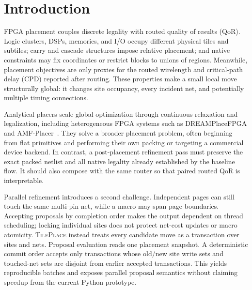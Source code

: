 \documentclass[sigconf,anonymous,review]{acmart}
\newcommand{\system}{\textsc{TilePlace}}
\begin{document}
\maketitle

\section{Introduction}

FPGA placement couples discrete legality with routed quality of results (QoR).
Logic clusters, DSPs, memories, and I/O occupy different physical tiles and
subtiles; carry and cascade structures impose relative placement; and native
constraints may fix coordinates or restrict blocks to unions of regions.
Meanwhile, placement objectives are only proxies for the routed wirelength and
critical-path delay (CPD) reported after routing.  These properties make a
small local move structurally global: it changes site occupancy, every
incident net, and potentially multiple timing connections.

Analytical placers scale global optimization through continuous relaxation
and legalization, including heterogeneous FPGA systems such as
DREAMPlaceFPGA and AMF-Placer~\cite{rajarathnam2022dreamplacefpga,liang2024amf}.
They solve a broader placement problem, often beginning from flat primitives
and performing their own packing or targeting a commercial device backend.
In contrast, a post-placement refinement pass must preserve the exact packed
netlist and all native legality already established by the baseline flow.  It
should also compose with the same router so that paired routed QoR is
interpretable.

Parallel refinement introduces a second challenge.  Independent pages can
still touch the same multi-pin net, while a macro may span page boundaries.
Accepting proposals by completion order makes the output dependent on thread
scheduling; locking individual sites does not protect net-cost updates or
macro atomicity.  \system{} instead treats every candidate move as a
transaction over sites and nets.  Proposal evaluation reads one placement
snapshot.  A deterministic commit order accepts only transactions whose
old/new site write sets and touched-net sets are disjoint from earlier accepted
transactions.  This yields reproducible batches and exposes parallel proposal
semantics without claiming speedup from the current Python prototype.
\end{document}
